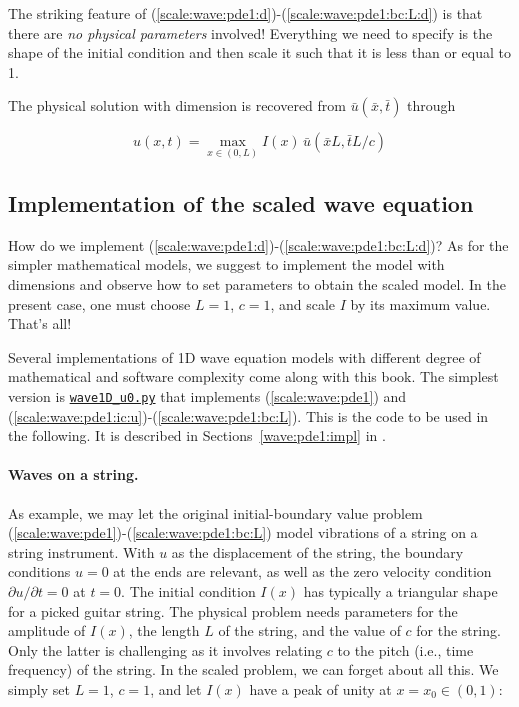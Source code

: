 \documentclass[graybox,envcountchap,sectrefs,final]{svmonodo}
\begin{document}
The striking feature of
(\ref{scale:wave:pde1:d})-(\ref{scale:wave:pde1:bc:L:d})
is that there are \emph{no physical parameters} involved! Everything we need
to specify is the shape of the initial condition and then scale it
such that it is less than or equal to 1.

The physical solution with dimension is recovered from $\bar u(\bar x,\bar t)$
through

\begin{equation}
u(x,t) = \max_{x\in(0,L)}I(x)\,\bar u(\bar x L, \bar t L/c)
\end{equation}

\subsection{Implementation of the scaled wave equation}

How do we implement (\ref{scale:wave:pde1:d})-(\ref{scale:wave:pde1:bc:L:d})?
As for the simpler mathematical models, we suggest to implement the model
with dimensions and observe how to set parameters to obtain the scaled
model. In the present case, one must choose $L=1$, $c=1$, and scale $I$ by its
maximum value. That's all!

Several implementations of 1D wave equation models with different
degree of mathematical and software complexity come along with this
book. The simplest
version is \href{{http://tinyurl.com/o8pb3yy/wave1D_u0.py}}{\nolinkurl{wave1D_u0.py}}
that implements (\ref{scale:wave:pde1}) and
(\ref{scale:wave:pde1:ic:u})-(\ref{scale:wave:pde1:bc:L}).
This is the code to be used in the following. It is described
in Sections~\ref{wave:pde1:impl} in \cite{Langtangen_Linge_fdm}.


\paragraph{Waves on a string.}
As example, we may let the original initial-boundary value problem
(\ref{scale:wave:pde1})-(\ref{scale:wave:pde1:bc:L}) model vibrations of
a string on a string instrument. With $u$ as the displacement of the
string, the boundary conditions $u=0$ at the ends are relevant, as
well as the zero velocity condition $\partial u/\partial t=0$ at
$t=0$.  The initial condition $I(x)$ has typically a triangular shape
for a picked guitar string.  The physical problem needs parameters for
the amplitude of $I(x)$, the length $L$ of the string, and the value
of $c$ for the string. Only the latter is challenging as it involves
relating $c$ to the pitch (i.e., time frequency) of the string. In the
scaled problem, we can forget about all this. We simply set $L=1$,
$c=1$, and let $I(x)$ have a peak of unity at $x=x_0\in(0,1)$:
\end{document}
